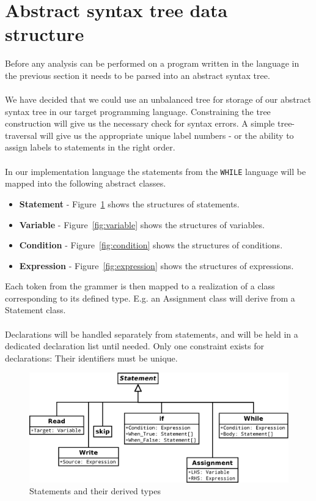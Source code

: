 \section{Abstract syntax tree data structure}\label{section:Abstractsyntaxtreedatastructure}
\label{sec:constructing_ast}
Before any analysis can be performed on a program written in the language in the previous section it needs to be parsed into an abstract syntax tree.\\\\
We have decided that we could use an unbalanced tree for storage of our abstract syntax tree in our target programming language. Constraining the tree construction will give us the necessary check for syntax errors.
A simple tree-traversal will give us the appropriate unique label numbers - or the ability to assign labels to statements in the right order.
\\
\\
In our implementation language the statements from the \texttt{WHILE} language will be mapped into the following abstract classes.
\begin{itemize}
	\item \textbf{Statement} - Figure~\ref{fig:statement} shows the structures of statements.
	\item \textbf{Variable} - Figure~\ref{fig:variable} shows the structures of variables.
	\item \textbf{Condition} - Figure~\ref{fig:condition} shows the structures of conditions.
	\item \textbf{Expression} - Figure~\ref{fig:expression} shows the structures of expressions.
\end{itemize}
Each token from the grammer is then mapped to a realization of a class corresponding to its defined type. E.g. an Assignment class will derive from a Statement class.
\\\\
Declarations will be handled separately from statements, and will be held in a dedicated declaration list until needed. Only one constraint exists for declarations: Their identifiers must be unique.

\begin{figure}[h]
	\centering
	\includegraphics[scale=0.5]{../fig/Statement}
	\caption{Statements and their derived types}
	\label{fig:statement}
\end{figure}

